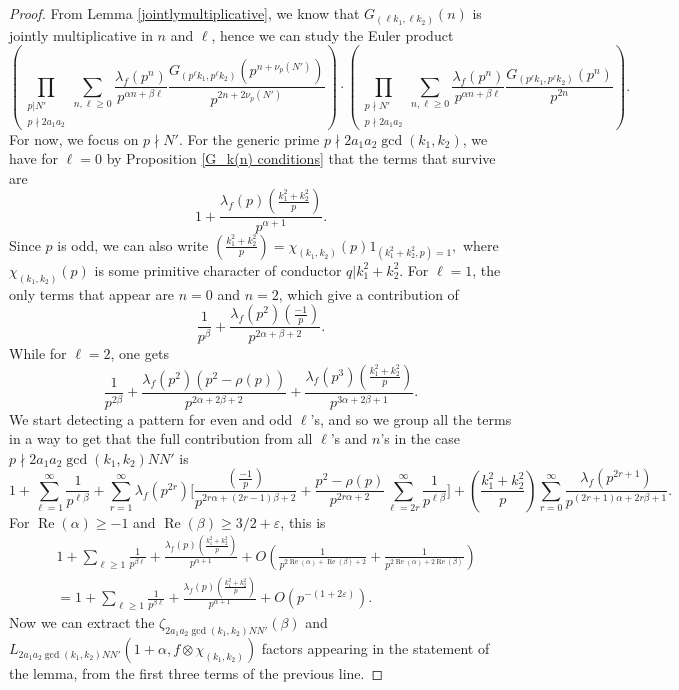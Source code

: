 \documentclass[12pt]{amsart}
\def\Re{\operatorname{Re}}
\def\gcd{\operatorname{gcd}}
\begin{document}
\begin{proof}
   From Lemma \ref{jointlymultiplicative}, we know that $G_{(\ell k_1,\ell k_2)}(n)$ is jointly multiplicative in $n$ and $\ell$, hence we can study the Euler product
    $$ \left( \prod_{\substack{p| N' \\ p\nmid 2a_1a_2}} \sum_{n, \ell \geq 0} \frac{\lambda_f({p^n})}{p^{\alpha n+\beta \ell}} \frac{G_{(p^{\ell} k_1, p^{\ell}k_2)}(p^{n+\nu_p(N')})}{p^{2n+2\nu_p(N')}} \right) \cdot \left( \prod_{\substack{p \nmid N' \\ p\nmid 2a_1a_2}} \sum_{n, \ell \geq 0} \frac{\lambda_f({p^n})}{p^{\alpha n+\beta \ell}} \frac{G_{(p^{\ell} k_1, p^{\ell}k_2)}(p^n)}{p^{2n}} \right) . $$
    For now, we focus on $p\nmid N'$. For the generic prime $p\nmid 2a_1a_2\gcd(k_1,k_2)$, we have for $\ell=0$ by Proposition \ref{G_k(n) conditions} that the terms that survive are
    $$ 1+\frac{\lambda_f(p)\left(  \frac{k_1^2+k_2^2}{p}\right)}{p^{\alpha+1}}.$$
    Since $p$ is odd, we can also write $\left(\frac{k_1^2+k_2^2}{p}\right) = \chi_{(k_1, k_2)}(p) 1_{(k_1^2+k_2^2,p)=1} ,$ where $ \chi_{(k_1,k_2)}(p)$ is some primitive character of conductor $q|k_1^2+k_2^2$. For $\ell=1$, the only terms that appear are $n=0$ and $n=2$, which give a contribution of 
    \[\frac{1}{p^{\beta}}+\frac{\lambda_f(p^2)\left(\frac{-1}{p}\right)}{p^{2\alpha+\beta+2}}.\]
    While for $\ell= 2$, one gets
\[\frac{1}{p^{2\beta}}+\frac{\lambda_f(p^2)(p^2-\rho(p))}{p^{2\alpha+2\beta+2}}+\frac{\lambda_f(p^3)\left(\frac{k_1^2+k_2^2}{p}\right)}{p^{3\alpha+2\beta+1}}.\]
We start detecting a pattern for even and odd $\ell$'s, and so we group all the terms in a way to get that the full contribution from all $\ell$'s and $n$'s in the case $p\nmid 2a_1a_2\gcd(k_1,k_2)NN'$ is
\[1+\sum_{\ell=1}^{\infty}\frac{1}{p^{\ell\beta}}+\sum_{r=1}^{\infty}\lambda_f(p^{2r})\Bigg[\frac{\left(\frac{-1}{p}\right)}{p^{2r\alpha+(2r-1)\beta+2}}+\frac{p^2-\rho(p)}{p^{2r\alpha+2}}\sum_{\ell=2r}^{\infty}\frac{1}{p^{\ell\beta}}\Bigg]+\left(\frac{k_1^2+k_2^2}{p}\right)\sum_{r=0}^{\infty}\frac{\lambda_f(p^{2r+1})}{p^{(2r+1)\alpha+2r\beta+1}}.\]
   For $\Re(\alpha) \geq -1$ and $\Re(\beta)\geq 3/2+\varepsilon$, this is
    \begin{align*}
    &1+\sum_{\ell\geq 1}\frac{1}{p^{ \beta\ell}} +\frac{\lambda_f(p)\left(  \frac{k_1^2+k_2^2}{p}\right)}{p^{\alpha+1}}+ O\left( \frac{1}{p^{2\Re(\alpha)+\Re(\beta)+2}} + \frac{1}{p^{2\Re(\alpha) + 2\Re(\beta)}}\right) \\
    &=1+ \sum_{\ell\geq 1}\frac{1}{p^{\beta \ell}} +\frac{\lambda_f(p)\left(  \frac{k_1^2+k_2^2}{p}\right)}{p^{\alpha+1}}+ O( p^{-(1+2\varepsilon)}).
    \end{align*} 
   Now we can extract the  $\zeta_{2a_1a_2\gcd(k_1,k_2)NN'}(\beta )$ and $L_{2a_1a_2\gcd(k_1,k_2)NN'}(1+\alpha,f\otimes\chi_{(k_1,k_2)})$ factors appearing in the statement of the lemma, from the first three terms of the previous line.
    

\end{proof}
\end{document}
